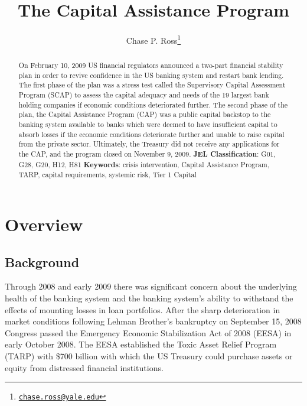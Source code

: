\documentclass[12pt]{article}
\begin{document}
	\lhead{}
	\rhead{}
	\renewcommand{\headrulewidth}{0.0pt}
	\renewcommand{\footrulewidth}{0.0pt}

\title{The Capital Assistance Program}
\author{Chase P. Ross\thanks{\texttt{\href{mailto:chase.ross@yale.edu}{chase.ross@yale.edu}}}}
\date{}


	\maketitle

	\begin{abstract}
On February 10, 2009 US financial regulators announced a two-part financial stability plan in order to revive confidence in the US banking system and restart bank lending. The first phase of the plan was a stress test called the Supervisory Capital Assessment Program (SCAP) to assess the capital adequacy and needs of the 19 largest bank holding companies if economic conditions deteriorated further. The second phase of the plan, the Capital Assistance Program (CAP) was a public capital backstop to the banking system available to banks which were deemed to have insufficient capital to absorb losses if the economic conditions deteriorate further and unable to raise capital from the private sector. Ultimately, the Treasury did not receive any applications for the CAP, and the program closed on November 9, 2009.
\newline
\newline
\textbf{JEL Classification}: G01, G28, G20, H12, H81
\newline
\textbf{Keywords}: crisis intervention, Capital Assistance Program, TARP,  capital requirements, systemic risk, Tier 1 Capital

\end{abstract}
\newpage
\tableofcontents
\newpage

\section{Overview}

\subsection{Background}

Through 2008 and early 2009 there was significant concern about the underlying health of the banking system and the banking system's ability to withstand the effects of mounting losses in loan portfolios. After the sharp deterioration in market conditions following Lehman Brother's bankruptcy on September 15, 2008 Congress passed the Emergency Economic Stabilization Act of 2008 (EESA) in early October 2008. The EESA established the Toxic Asset Relief Program (TARP) with \$700 billion with which the US Treasury could purchase assets or equity from distressed financial institutions.
\end{document}

